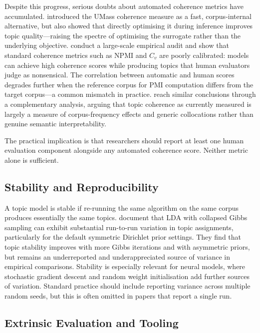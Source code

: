 \documentclass[11pt,a4paper]{article}
\begin{document}
Despite this progress, serious doubts about automated coherence metrics
have accumulated.
\textcite{mimno2011optimizing} introduced the UMass coherence measure
as a fast, corpus-internal alternative, but also showed that directly
optimising it during inference improves topic quality---raising the
spectre of optimising the surrogate rather than the underlying
objective.
\textcite{hoyle2021automated} conduct a large-scale empirical audit
and show that standard coherence metrics such as NPMI and $C_{v}$
are poorly calibrated: models can achieve high coherence scores
while producing topics that human evaluators judge as nonsensical.
The correlation between automatic and human scores degrades further
when the reference corpus for PMI computation differs from the
target corpus---a common mismatch in practice.
\textcite{doogan2021twaddle} reach similar conclusions through a
complementary analysis, arguing that topic coherence as currently
measured is largely a measure of corpus-frequency effects and generic
collocations rather than genuine semantic interpretability.

The practical implication is that researchers should report at least
one human evaluation component alongside any automated coherence
score.
Neither metric alone is sufficient.

\subsection{Stability and Reproducibility}
\label{sec:eval-stability}

A topic model is stable if re-running the same algorithm on the same
corpus produces essentially the same topics.
\textcite{koltcov2014lda} document that LDA with collapsed Gibbs
sampling can exhibit substantial run-to-run variation in topic
assignments, particularly for the default symmetric Dirichlet prior
settings.
They find that topic stability improves with more Gibbs iterations and
with asymmetric priors, but remains an underreported and underappreciated
source of variance in empirical comparisons.
Stability is especially relevant for neural models, where stochastic
gradient descent and random weight initialisation add further sources
of variation.
Standard practice should include reporting variance across multiple
random seeds, but this is often omitted in papers that report a single
run.

\subsection{Extrinsic Evaluation and Tooling}
\label{sec:eval-extrinsic}
\end{document}
